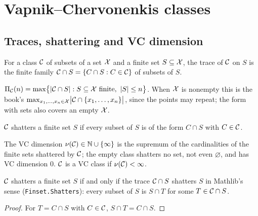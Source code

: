 \chapter{Vapnik--Chervonenkis classes}
\label{chap:vc}

\section{Traces, shattering and VC dimension}

\begin{definition}[Trace]
  \label{def:trace}
  For a class $\mathcal{C}$ of subsets of a set $\mathcal{X}$ and a finite set $S\subseteq\mathcal{X}$, the trace of $\mathcal{C}$ on $S$ is the finite family $\mathcal{C}\cap S=\{C\cap S:C\in\mathcal{C}\}$ of subsets of $S$.
\end{definition}

\begin{definition}
  \label{def:han-4-7}
  $\Pi_{\mathcal{C}}(n)=\max\bigl\{|\mathcal{C}\cap S|:S\subseteq\mathcal{X}\text{ finite},\ |S|\le n\bigr\}$. When $\mathcal{X}$ is nonempty this is the book's $\max_{x_1,\dots,x_n\in\mathcal{X}}\bigl|\mathcal{C}\cap\{x_1,\dots,x_n\}\bigr|$, since the points may repeat; the form with sets also covers an empty $\mathcal{X}$.
\end{definition}

\begin{definition}
  \label{def:han-4-8}
  $\mathcal{C}$ shatters a finite set $S$ if every subset of $S$ is of the form $C\cap S$ with $C\in\mathcal{C}$.
\end{definition}

\begin{definition}
  \label{def:han-4-9}
  The VC dimension $\nu(\mathcal{C})\in\mathbb{N}\cup\{\infty\}$ is the supremum of the cardinalities of the finite sets shattered by $\mathcal{C}$; the empty class shatters no set, not even $\varnothing$, and has VC dimension $0$. $\mathcal{C}$ is a VC class if $\nu(\mathcal{C})<\infty$.
\end{definition}

\begin{lemma}
  \label{lem:shatters-trace}
  $\mathcal{C}$ shatters a finite set $S$ if and only if the trace $\mathcal{C}\cap S$ shatters $S$ in Mathlib's sense (\texttt{Finset.Shatters}): every subset of $S$ is $S\cap T$ for some $T\in\mathcal{C}\cap S$.
\end{lemma}
\begin{proof}
  For $T=C\cap S$ with $C\in\mathcal{C}$, $S\cap T=C\cap S$.
\end{proof}

